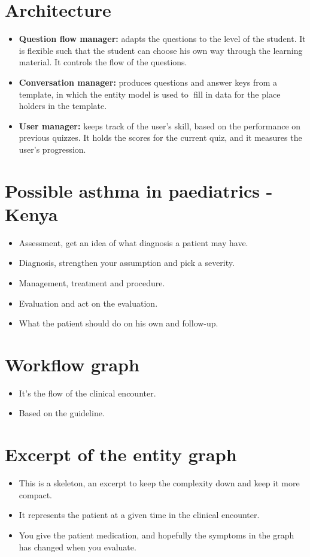 \documentclass[20pt]{extarticle}
\begin{document}
	\section{Architecture}
	\begin{itemize}
		\item \textbf{Question flow manager:} adapts the questions to the level of the student. It is flexible such that the student can choose his own way through the learning material. It controls the flow of the questions.
		\item \textbf{Conversation manager:} produces questions and answer keys from a template, in which the entity model is used to fill in data for the place holders in the template.
		\item \textbf{User manager:} keeps track of the user's skill, based on the performance on previous quizzes. It holds the scores for the current quiz, and it measures the user's progression.
	\end{itemize}
	
	\section{Possible asthma in paediatrics - Kenya}
	\begin{itemize}
		\item Assessment, get an idea of what diagnosis a patient may have.
		\item Diagnosis, strengthen your assumption and pick a severity.
		\item Management, treatment and procedure.
		\item Evaluation and act on the evaluation.
		\item What the patient should do on his own and follow-up.
	\end{itemize}
	
	\section{Workflow graph}
	\begin{itemize}
		\item It's the flow of the clinical encounter.
		\item Based on the guideline.
	\end{itemize}

	\section{Excerpt of the entity graph}
	\begin{itemize}
		\item This is a skeleton, an excerpt to keep the complexity down and keep it more compact.
		\item It represents the patient at a given time in the clinical encounter.
		\item You give the patient medication, and hopefully the symptoms in the graph has changed when you evaluate.
	\end{itemize}
\end{document}

